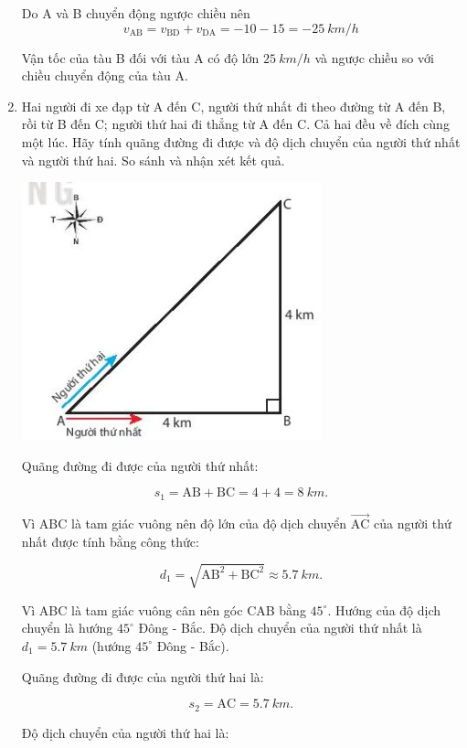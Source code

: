 \begin{enumerate}[label=\bfseries Câu \arabic*:]
{	Do A và B chuyển động ngược chiều nên
	$$v_\text{AB} = v_\text{BD} + v_\text{DA} = -10-15 = \SI{-25}{km/h}$$
	
	Vận tốc của tàu B đối với tàu A có độ lớn $\SI{25}{km/h}$ và ngược chiều so với chiều chuyển động của tàu A.
}
\item {}


{
	Hai người đi xe đạp từ A đến C, người thứ nhất đi theo đường từ A đến B, rồi từ B đến C; người thứ hai đi thẳng từ A đến C. Cả hai đều về đích cùng một lúc. Hãy tính quãng đường đi được và độ dịch chuyển của người thứ nhất và người thứ hai. So sánh và nhận xét kết quả.
	
	\begin{center}
		\includegraphics[scale=1]{../figs/VN10-2022-PH-TP004-5.jpg}
	\end{center}
}

\hideall
{	
	
	Quãng đường đi được của người thứ nhất:
	
	$$s_1 = \text{AB} + \text{BC} = 4+4 = \SI{8}{km}.$$
	
	Vì ABC là tam giác vuông nên độ lớn của độ dịch chuyển $\vec{\text{AC}}$ của người thứ nhất được tính bằng công thức:
	
	$$d_1 = \sqrt{\text{AB}^2 + \text{BC}^2} \approx \SI{5,7}{km}.$$
	
	Vì ABC là tam giác vuông cân nên góc CAB bằng $45^\circ$. Hướng của độ dịch chuyển là hướng $45^\circ$ Đông - Bắc. Độ dịch chuyển của người thứ nhất là $d_1 = \SI{5,7}{km}$ (hướng $45^\circ$ Đông - Bắc).
	
	Quãng đường đi được của người thứ hai là:
	
	$$s_2 = \text{AC} = \SI{5,7}{km}.$$
	
	Độ dịch chuyển của người thứ hai là:
	
}
\end{enumerate}
